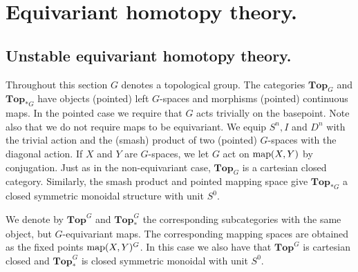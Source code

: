 \chapter{Equivariant homotopy theory.}
\section{Unstable equivariant homotopy theory.}\label{sec:unstablehomotopytheory}
Throughout this section $G$ denotes a topological group. The categories
$\mathbf{Top}_G$ and $\mathbf{Top}_{\ast G}$ have objects
(pointed) left $G$-spaces and morphisms (pointed) continuous
maps. In the pointed case we require that $G$ acts trivially on
the basepoint. Note also that we do not require maps to be equivariant.
We equip $S^n, I$ and $D^n$ with the trivial action 
and the (smash) product of two  (pointed) $G$-spaces with the diagonal action. If $X$ and $Y$ are
$G$-spaces, we let $G$ act on $\mathrm{map}(X,Y)$ by conjugation. Just as in the
non-equivariant case, $\mathbf{Top}_G$ is a cartesian closed category. Similarly, the smash product
and pointed mapping space give $\mathbf{Top}_{\ast G}$
a closed symmetric monoidal structure with unit $S^0$.

We denote by $\mathbf{Top}^G$ and $\mathbf{Top}_\ast^G$ the corresponding
subcategories with the same object, but $G$-equivariant maps. The corresponding
mapping spaces are obtained as the fixed points $\mathrm{map}(X,Y)^G$.
In this case we also have that $\mathbf{Top}^G$ is cartesian closed
and $\mathbf{Top}_\ast^G$ is closed symmetric monoidal with unit $S^0$.

